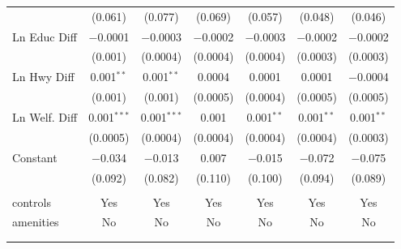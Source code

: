 \begin{table}[!htbp]
\begin{tabular}{@{\extracolsep{5pt}}lcccccc}
  & (0.061) & (0.077) & (0.069) & (0.057) & (0.048) & (0.046) \\ 
  Ln Educ Diff & $-$0.0001 & $-$0.0003 & $-$0.0002 & $-$0.0003 & $-$0.0002 & $-$0.0002 \\ 
  & (0.001) & (0.0004) & (0.0004) & (0.0004) & (0.0003) & (0.0003) \\ 
  Ln Hwy Diff & 0.001$^{**}$ & 0.001$^{**}$ & 0.0004 & 0.0001 & 0.0001 & $-$0.0004 \\ 
  & (0.001) & (0.001) & (0.0005) & (0.0004) & (0.0005) & (0.0005) \\ 
  Ln Welf. Diff & 0.001$^{***}$ & 0.001$^{***}$ & 0.001 & 0.001$^{**}$ & 0.001$^{**}$ & 0.001$^{**}$ \\ 
  & (0.0005) & (0.0004) & (0.0004) & (0.0004) & (0.0004) & (0.0003) \\ 
  Constant & $-$0.034 & $-$0.013 & 0.007 & $-$0.015 & $-$0.072 & $-$0.075 \\ 
  & (0.092) & (0.082) & (0.110) & (0.100) & (0.094) & (0.089) \\ 
 \hline \\[-1.8ex] 
controls & Yes & Yes & Yes & Yes & Yes & Yes \\ 
amenities & No & No & No & No & No & No \\ 
\hline \\[-1.8ex] 
\hline 
\hline \\[-1.8ex] 
\end{tabular} 
\end{table} 
